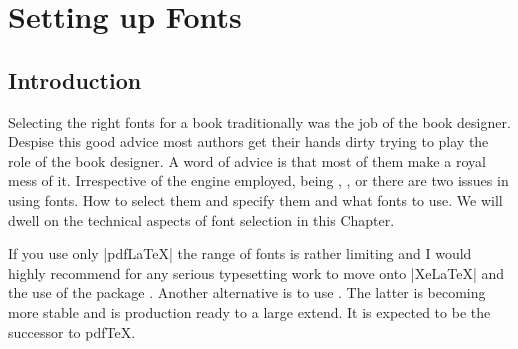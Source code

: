 \makeatletter\@specialtrue\makeatother

\newcommand{\mf}{{\fontencoding{U}\fontfamily{zmf}\selectfont METAFONT}}

\newcommand{\pcstrut}{\vrule height11pt width0pt}

\newcommand{\sample}{Typographia Ars Artium Omnium Conservatrix}

\newcommand{\thefont}[4][OT1]{%
	\textcolor{thefontname}{#2}&%
	\pcstrut\fontencoding{#1}\fontfamily{#3}\selectfont#4\\}

\newcommand{\fonttitle}[1]{%
	\multicolumn2{p{\columnwidth}}{\vrule height1.5pc width0pt
	\fontseries{b}\selectfont\textcolor{Subheadings}{#1}}\\[3pt]}

\newcommand{\normalencoding}{\fontencoding{OT1}}
\newcommand\ttverb[1]{\texttt{\string#1}}




\chapter{Setting up Fonts}
\label{ch:fonts}
\section{Introduction}


Selecting the right fonts for a book traditionally was the job of the book designer. Despise this good advice most \latex authors get their hands dirty trying to play the role of the book designer. A word of advice is that most of them make a royal mess of it. Irrespective of the \tex engine employed, being \tex, \latexe, \lualatex or \xelatex there are two issues in using fonts. How to select them and specify them and what fonts to use. We will dwell on the technical aspects of font selection in this Chapter.


If you use only |pdfLaTeX| the range of fonts is rather limiting and I would highly recommend for any serious typesetting work to move onto |XeLaTeX| and the use of the package  \citep{fontspec}. Another alternative is to use \lualatex. The latter is becoming more stable and is production ready to a large extend. It is expected to be the successor to pdfTeX.

